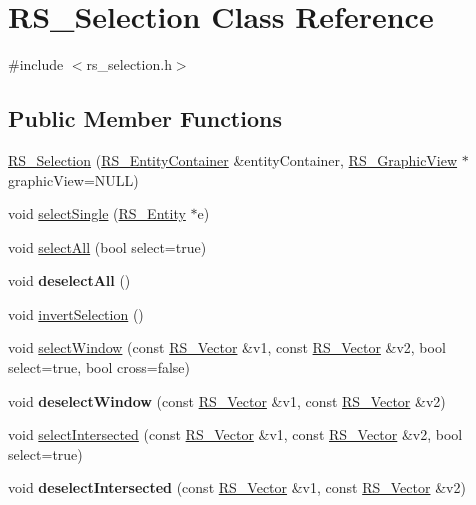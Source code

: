 \hypertarget{classRS__Selection}{\section{R\-S\-\_\-\-Selection Class Reference}
\label{classRS__Selection}
}


{\ttfamily \#include $<$rs\-\_\-selection.\-h$>$}

\subsection*{Public Member Functions}
\begin{DoxyCompactItemize}
\item 
\hyperlink{classRS__Selection_a544f5446d1210169fdf8434db530635d}{R\-S\-\_\-\-Selection} (\hyperlink{classRS__EntityContainer}{R\-S\-\_\-\-Entity\-Container} \&entity\-Container, \hyperlink{classRS__GraphicView}{R\-S\-\_\-\-Graphic\-View} $\ast$graphic\-View=N\-U\-L\-L)
\item 
void \hyperlink{classRS__Selection_a65929b5025aa61bfc676384d26bdb168}{select\-Single} (\hyperlink{classRS__Entity}{R\-S\-\_\-\-Entity} $\ast$e)
\item 
void \hyperlink{classRS__Selection_a2ad9aac95c28ce5c674cba470c063ee9}{select\-All} (bool select=true)
\item 
\hypertarget{classRS__Selection_a133c4a98039ac624fd1ac65c14fcad94}{void {\bfseries deselect\-All} ()}\label{classRS__Selection_a133c4a98039ac624fd1ac65c14fcad94}

\item 
void \hyperlink{classRS__Selection_a79059f9447af76e2d037d63350191aea}{invert\-Selection} ()
\item 
void \hyperlink{classRS__Selection_ae4a3b56e1cb756218a6f8490e36ab89a}{select\-Window} (const \hyperlink{classRS__Vector}{R\-S\-\_\-\-Vector} \&v1, const \hyperlink{classRS__Vector}{R\-S\-\_\-\-Vector} \&v2, bool select=true, bool cross=false)
\item 
\hypertarget{classRS__Selection_ac185741ae654648375527f4e5fec3a15}{void {\bfseries deselect\-Window} (const \hyperlink{classRS__Vector}{R\-S\-\_\-\-Vector} \&v1, const \hyperlink{classRS__Vector}{R\-S\-\_\-\-Vector} \&v2)}\label{classRS__Selection_ac185741ae654648375527f4e5fec3a15}

\item 
void \hyperlink{classRS__Selection_a9f20b94b8c7ba4f384a7fa421389e988}{select\-Intersected} (const \hyperlink{classRS__Vector}{R\-S\-\_\-\-Vector} \&v1, const \hyperlink{classRS__Vector}{R\-S\-\_\-\-Vector} \&v2, bool select=true)
\item 
\hypertarget{classRS__Selection_a7a7d2513fa23561e2ffb200ce869d28b}{void {\bfseries deselect\-Intersected} (const \hyperlink{classRS__Vector}{R\-S\-\_\-\-Vector} \&v1, const \hyperlink{classRS__Vector}{R\-S\-\_\-\-Vector} \&v2)}\label{classRS__Selection_a7a7d2513fa23561e2ffb200ce869d28b}


\end{DoxyCompactItemize}

